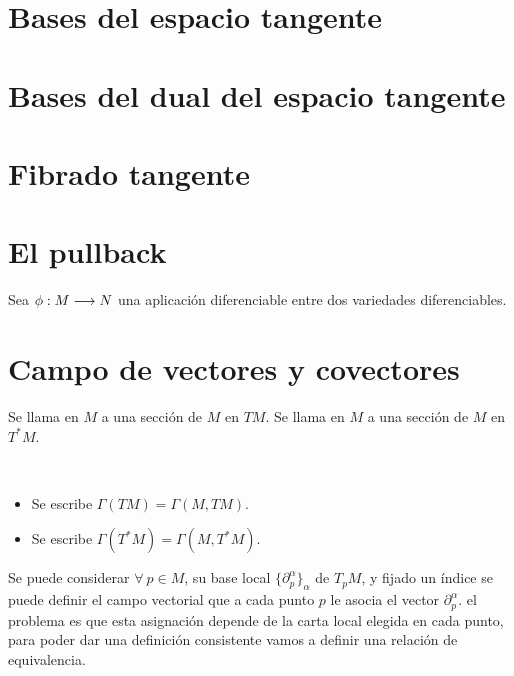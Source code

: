 \section{Bases del espacio tangente}\label{sec:bases-espacio-tangente}


\section{Bases del dual del espacio tangente}\label{sec:bases-dual-espacio-tangente}



\section{Fibrado tangente}\label{sec:fibrado-tangente}


\section{El pullback}\label{sec:pullback}
Sea $\phi:M\longrightarrow N$ una aplicación diferenciable entre dos variedades diferenciables.

\section{Campo de vectores y covectores}\label{sec:campo-vectores-covectores}
\begin{definition}
  Se llama  en $M$ a una sección de $M$ en $TM$.
  Se llama  en $M$ a una sección de $M$ en $T^* M$.
\end{definition}

\begin{notation}
  \
  \begin{itemize}
    \item Se escribe $\Gamma(TM) = \Gamma(M, TM)$.
    \item Se escribe $\Gamma(T^*M) = \Gamma(M, T^*M)$.
  \end{itemize}
\end{notation}

Se puede considerar $\forall\ p\in M$, su base local $\{\partial_p^\alpha\}_\alpha$ de $T_p M$, y fijado un índice
se puede definir el campo vectorial que a cada punto $p$ le asocia el vector $\partial_p^\alpha$. el problema es que
esta asignación depende de la carta local elegida en cada punto, para poder dar una definición consistente vamos a
definir una relación de equivalencia.

